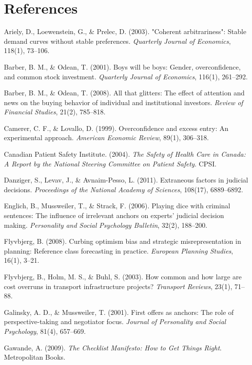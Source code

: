 \documentclass[12pt, letterpaper]{article}
\begin{document}
\medskip


\section*{References}


Ariely, D., Loewenstein, G., \& Prelec, D. (2003). "Coherent arbitrariness": Stable demand curves without stable preferences. \textit{Quarterly Journal of Economics}, 118(1), 73--106.

Barber, B. M., \& Odean, T. (2001). Boys will be boys: Gender, overconfidence, and common stock investment. \textit{Quarterly Journal of Economics}, 116(1), 261--292.

Barber, B. M., \& Odean, T. (2008). All that glitters: The effect of attention and news on the buying behavior of individual and institutional investors. \textit{Review of Financial Studies}, 21(2), 785--818.

Camerer, C. F., \& Lovallo, D. (1999). Overconfidence and excess entry: An experimental approach. \textit{American Economic Review}, 89(1), 306--318.

Canadian Patient Safety Institute. (2004). \textit{The Safety of Health Care in Canada: A Report by the National Steering Committee on Patient Safety}. CPSI.

Danziger, S., Levav, J., \& Avnaim-Pesso, L. (2011). Extraneous factors in judicial decisions. \textit{Proceedings of the National Academy of Sciences}, 108(17), 6889--6892.

Englich, B., Mussweiler, T., \& Strack, F. (2006). Playing dice with criminal sentences: The influence of irrelevant anchors on experts' judicial decision making. \textit{Personality and Social Psychology Bulletin}, 32(2), 188--200.

Flyvbjerg, B. (2008). Curbing optimism bias and strategic misrepresentation in planning: Reference class forecasting in practice. \textit{European Planning Studies}, 16(1), 3--21.

Flyvbjerg, B., Holm, M. S., \& Buhl, S. (2003). How common and how large are cost overruns in transport infrastructure projects? \textit{Transport Reviews}, 23(1), 71--88.

Galinsky, A. D., \& Mussweiler, T. (2001). First offers as anchors: The role of perspective-taking and negotiator focus. \textit{Journal of Personality and Social Psychology}, 81(4), 657--669.

Gawande, A. (2009). \textit{The Checklist Manifesto: How to Get Things Right}. Metropolitan Books.
\end{document}
